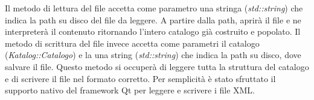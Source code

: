 Il metodo di lettura del file accetta come parametro una stringa (\emph{std::string}) che indica la path su disco del file da leggere. A partire dalla path, aprirà il file e 
ne interpreterà il contenuto ritornando l'intero catalogo già costruito e popolato. Il metodo di scrittura del file invece accetta come parametri il catalogo (\emph{Katalog::Catalogo}) e 
la una string (\emph{std::string}) che indica la path su disco, dove salvare il file. Questo metodo si occuperà di leggere tutta la struttura del catalogo e di scrivere il file nel formato corretto.
Per semplicità è stato sfruttato il supporto nativo del framework Qt per leggere e scrivere i file XML.